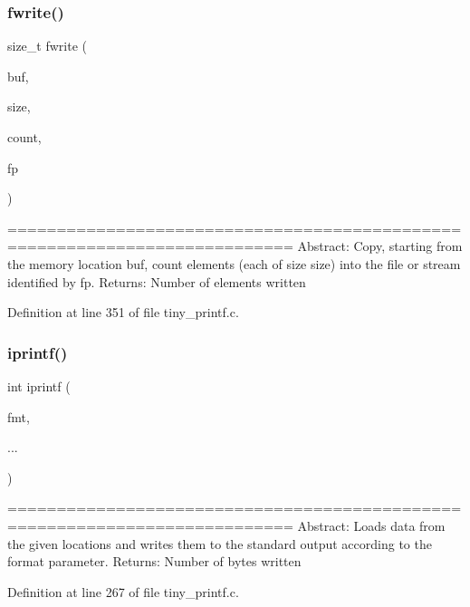 \mbox{\label{tiny__printf_8c_a0029a57f553c12eab57a20093d65901d}} 
\subsubsection{fwrite()}
{\footnotesize\ttfamily size\+\_\+t fwrite (\begin{DoxyParamCaption}\item[{const void $\ast$}]{buf,  }\item[{size\+\_\+t}]{size,  }\item[{size\+\_\+t}]{count,  }\item[{F\+I\+LE $\ast$}]{fp }\end{DoxyParamCaption})}

=========================================================================== Abstract\+: Copy, starting from the memory location buf, count elements (each of size size) into the file or stream identified by fp. Returns\+: Number of elements written 

 

Definition at line 351 of file tiny\+\_\+printf.\+c.

\mbox{\label{tiny__printf_8c_a3d46cb8e4ff4993263b4deb4aa0b48d8}} 
\subsubsection{iprintf()}
{\footnotesize\ttfamily int iprintf (\begin{DoxyParamCaption}\item[{const char $\ast$}]{fmt,  }\item[{}]{... }\end{DoxyParamCaption})}

=========================================================================== Abstract\+: Loads data from the given locations and writes them to the standard output according to the format parameter. Returns\+: Number of bytes written 

 

Definition at line 267 of file tiny\+\_\+printf.\+c.

\mbox{\label{tiny__printf_8c_ad41876f99f190c7488e64ef39c50a23f}} 
